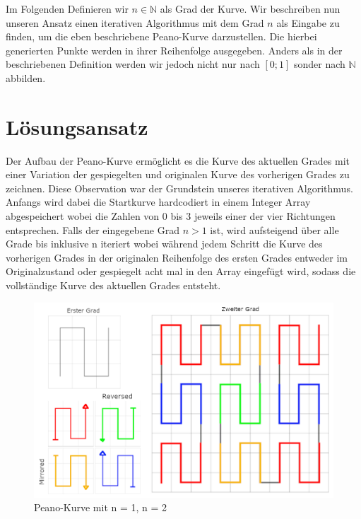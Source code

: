\documentclass[course=asp]{aspdoc}
\begin{document}
Im Folgenden Definieren wir $n \in \mathbb{N}$ als Grad der Kurve.
Wir beschreiben nun unseren Ansatz einen iterativen Algorithmus mit dem Grad $n$ als Eingabe zu finden, um die eben beschriebene Peano-Kurve darzustellen. Die hierbei generierten Punkte werden in ihrer Reihenfolge ausgegeben. Anders als in der beschriebenen Definition werden wir jedoch nicht nur nach $[0;1]$ sonder nach $\mathbb{N}$ abbilden.


\newpage

\section{Lösungsansatz}
Der Aufbau der Peano-Kurve ermöglicht es die Kurve des aktuellen Grades mit einer Variation der gespiegelten und originalen Kurve des vorherigen Grades zu zeichnen.
Diese Observation war der Grundstein unseres iterativen Algorithmus. Anfangs wird dabei die Startkurve hardcodiert in einem Integer Array abgespeichert wobei die Zahlen von 0 bis 3 jeweils einer der vier Richtungen entsprechen. Falls der eingegebene Grad $n > 1$ ist, wird aufsteigend über alle Grade bis inklusive n iteriert wobei während jedem Schritt die Kurve des vorherigen Grades in der originalen Reihenfolge des ersten Grades entweder im Originalzustand oder gespiegelt acht mal in den Array eingefügt wird, sodass die vollständige Kurve des aktuellen Grades entsteht. 

\begin{figure}[ht]
\centering
\includegraphics[scale=0.4]{PeanoFarbcodiert.png}
\caption{Peano-Kurve mit n = 1, n = 2}\label{Abb:Peano Lösungsidee}
\end{figure}
\end{document}
